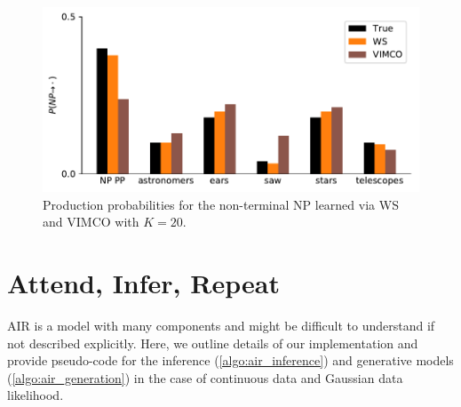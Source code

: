\begin{figure}[htb]
  \centering
  \includegraphics[width=0.7\linewidth]{figures/RRWS/pcfg/np_probs.pdf}
  \caption{Production probabilities for the non-terminal NP learned via \gls{WS} and \gls{VIMCO} with $K = 20$.}
  \label{fig:experiments/pcfg/production_probs}
  \vspace*{-2ex}
\end{figure}


\section{Attend, Infer, Repeat}
\label{app:air}

\Gls{AIR} is a model with many components and might be difficult to understand if not described explicitly.
Here, we outline details of our implementation and provide pseudo-code for the inference (\cref{algo:air_inference}) and generative models (\cref{algo:air_generation}) in the case of continuous data and Gaussian data likelihood.


